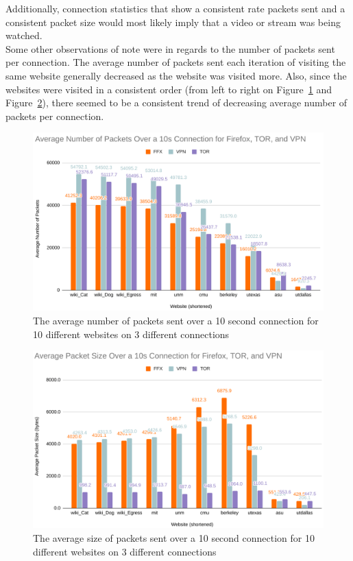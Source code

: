 \documentclass[11pt]{article}
\begin{document}
Additionally, connection statistics that show a consistent rate packets sent and a consistent packet
size would most likely imply that a video or stream was being watched.\\
Some other observations of note were in regards to the number of packets sent per connection. The 
average number of packets sent each iteration of visiting the same website generally decreased as the
website was visited more. Also, since the websites were visited in a consistent order (from left to 
right on Figure~\ref{fig:avg_packets} and Figure~\ref{fig:avg_size}), there seemed to be a consistent
trend of decreasing average number of packets per connection. 
\begin{figure}[p]
  \centering
  \includegraphics[width=1\linewidth]{./average_packets.png}
  \caption{\label{fig:avg_packets}
  The average number of packets sent over a 10 second connection for 10 different websites on 3 different connections}
\end{figure}
\begin{figure}[p]
  \centering
  \includegraphics[width=1\linewidth]{./average_size.png}
  \caption{\label{fig:avg_size}
  The average size of packets sent over a 10 second connection for 10 different websites on 3 different connections}
\end{figure}
\end{document}

